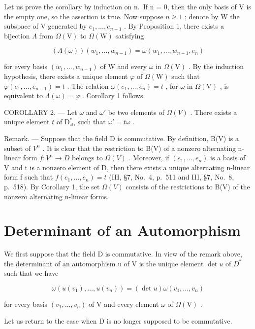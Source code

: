 Let us prove the corollary by induction on n.~If n = 0, then the only basis of V is the empty one, so the assertion is true. Now suppose \(n \geqslant 1\) ; denote by W the subspace of V generated by \(e_{1}, \ldots, e_{n-1}\) . By Proposition 1, there exists a bijection \(\Lambda\) from \(\Omega(\mathrm{V})\) to \(\Omega(\mathrm{W})\) satisfying

\[
(\Lambda (\omega)) (w _ {1}, \ldots , w _ {n - 1}) = \omega (w _ {1}, \ldots , w _ {n - 1}, e _ {n})
\]

for every basis \((w_{1},\ldots,w_{n-1})\) of W and every \(\omega\) in \(\Omega(\mathrm{V})\) . By the induction hypothesis, there exists a unique element \(\varphi\) of \(\Omega(\mathrm{W})\) such that \(\varphi(e_{1},\ldots,e_{n-1})=t\) . The relation \(\omega(e_{1},\ldots,e_{n})=t\) , for \(\omega\) in \(\Omega(\mathrm{V})\) , is equivalent to \(\Lambda(\omega)=\varphi\) . Corollary 1 follows.

COROLLARY 2. --- Let \(\omega\) and \(\omega'\) be two elements of \(\Omega(V)\) . There exists a unique element \(t\) of \(\mathrm{D}_{\mathrm{ab}}^{*}\) such that \(\omega' = t\omega\) .

Remark. --- Suppose that the field D is commutative. By definition, B(V) is a subset of \(V^{n}\) . It is clear that the restriction to B(V) of a nonzero alternating n-linear form \(f: V^{n} \to D\) belongs to \(\Omega(V)\) . Moreover, if \((e_{1}, \ldots, e_{n})\) is a basis of V and t is a nonzero element of D, then there exists a unique alternating n-linear form f such that \(f(e_{1}, \ldots, e_{n}) = t\) (III, §7, No.~4, p.~511 and III, §7, No.~8, p.~518). By Corollary 1, the set \(\Omega(V)\) consists of the restrictions to B(V) of the nonzero alternating n-linear forms.

\section{Determinant of an Automorphism}

We first suppose that the field D is commutative. In view of the remark above, the determinant of an automorphism u of V is the unique element \(\det u\) of \(D^{*}\) such that we have

\[
\omega (u (v _ {1}), \ldots , u (v _ {n})) = (\det u) \omega (v _ {1}, \ldots , v _ {n})\tag{14}
\]

for every basis \((v_{1},\ldots ,v_{n})\) of V and every element \(\omega\) of \(\Omega (\mathrm{V})\) .

Let us return to the case when D is no longer supposed to be commutative.

